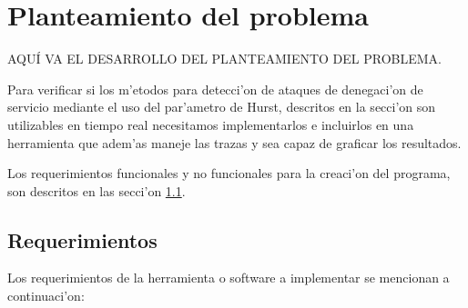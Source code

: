\chapter{Planteamiento del problema} \label{chap:planning}


AQU\'I VA EL DESARROLLO DEL PLANTEAMIENTO DEL PROBLEMA.
\vspace{5 mm}

Para verificar si los m'etodos para detecci'on de ataques de denegaci'on de
servicio mediante el uso del par'ametro de Hurst, descritos en la secci'on
son utilizables en tiempo real necesitamos 
implementarlos e incluirlos en una herramienta que adem'as maneje las trazas
y sea capaz de graficar los resultados. 

Los requerimientos funcionales y no funcionales para la creaci'on del programa,
son descritos en las secci'on \ref{sect:requirements}.  

\section{Requerimientos} \label{sect:requirements}

Los requerimientos de la herramienta o software a implementar se mencionan a
continuaci'on: 

